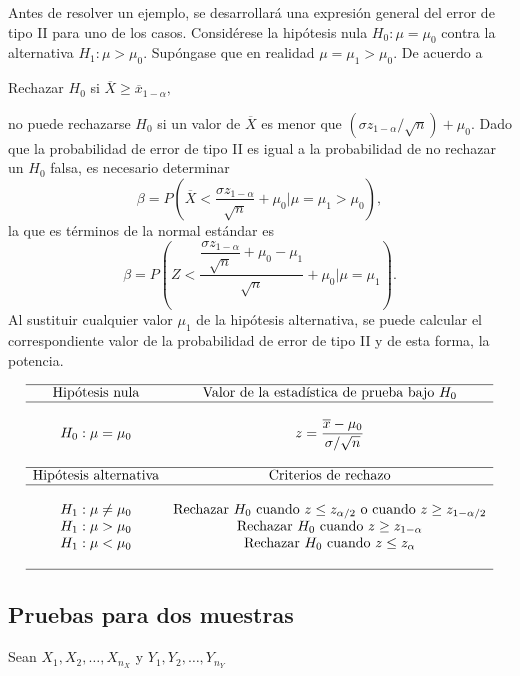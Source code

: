 Antes de resolver un ejemplo, se desarrollará una expresión general del error de tipo II para uno de los casos. Considérese la hipótesis nula $H_0:\mu=\mu_0$ contra la alternativa $H_1:\mu>\mu_0$. Supóngase que en realidad $\mu=\mu_1>\mu_0$. De acuerdo a 
\begin{center}
    Rechazar $H_0$ si $\overline{X}\geq \overline{x}_{1-\alpha},$
\end{center}
no puede rechazarse $H_0$ si un valor de $\overline{X}$ es menor que $(\sigma z_{1-\alpha}/\sqrt{n})+\mu_0$. Dado que la probabilidad de error de tipo II es igual a la probabilidad de no rechazar un $H_0$ falsa, es necesario determinar
$$\beta = P\left(\overline{X}<\dfrac{\sigma z_{1-\alpha}}{\sqrt{n}}+\mu_0 \bigg| \mu=\mu_1>\mu_0\right),$$
la que es términos de la normal estándar es
$$\beta = P\left(Z<\dfrac{\dfrac{\sigma z_{1-\alpha}}{\sqrt{n}}+\mu_0-\mu_1}{\sqrt{n}}+\mu_0 \Bigg| \mu=\mu_1\right).$$
Al sustituir cualquier valor $\mu_1$ de la hipótesis alternativa, se puede calcular el correspondiente valor de la probabilidad de error de tipo II y de esta forma, la potencia.

$$
\begin{array}{cc}
    \hline
    \mbox{Hipótesis nula} & \mbox{Valor de la estadística de prueba bajo } H_0\\
    \hline\\
    H_0: \mu=\mu_0 & z=\dfrac{\overline{x}-\mu_0}{\sigma/\sqrt{n}}\\\\
    \hline
    \mbox{Hipótesis alternativa} & \mbox{Criterios de rechazo}\\
    \hline\\
    H_1:\mu\neq \mu_0 & \mbox{Rechazar } H_0 \mbox{ cuando } z\leq z_{\alpha/2} \mbox{ o cuando } z\geq z_{1-\alpha/2}\\
    H_1:\mu> \mu_0 & \mbox{Rechazar } H_0 \mbox{ cuando } z\geq z_{1-\alpha}\\
    H_1:\mu< \mu_0 & \mbox{Rechazar } H_0 \mbox{ cuando } z\leq z_{\alpha}\\\\
    \hline
\end{array}
$$

\subsection{Pruebas para dos muestras}
Sean $X_1,X_2,\ldots,X_{n_X}$ y $Y_1,Y_2,\ldots,Y_{n_Y}$
